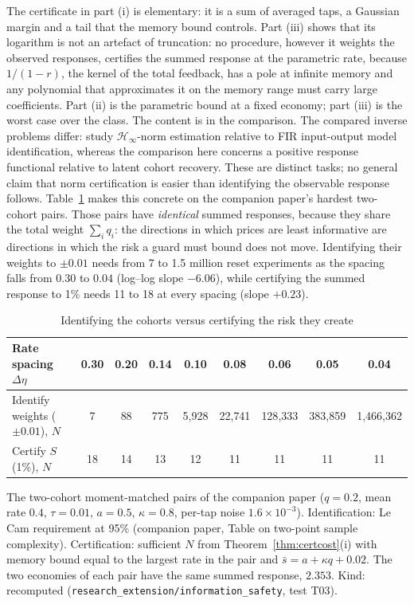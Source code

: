 The certificate in part (i) is elementary: it is a sum of averaged taps, a Gaussian margin and a tail that the memory bound controls. Part (iii) shows that its logarithm is not an artefact of truncation: no procedure, however it weights the observed responses, certifies the summed response at the parametric rate, because $1/(1-r)$, the kernel of the total feedback, has a pole at infinite memory and any polynomial that approximates it on the memory range must carry large coefficients. Part (ii) is the parametric bound at a fixed economy; part (iii) is the worst case over the class. The content is in the comparison. The compared inverse problems differ: \citet{tu2018} study $\mathcal H_\infty$-norm estimation relative to FIR input-output model identification, whereas the comparison here concerns a positive response functional relative to latent cohort recovery. These are distinct tasks; no general claim that norm certification is easier than identifying the observable response follows. Table~\ref{tab:certvsid} makes this concrete on the companion paper's hardest two-cohort pairs. Those pairs have \emph{identical} summed responses, because they share the total weight $\sum_iq_i$: the directions in which prices are least informative are directions in which the risk a guard must bound does not move. Identifying their weights to $\pm0.01$ needs from 7 to 1.5 million reset experiments as the spacing falls from $0.30$ to $0.04$ (log--log slope $-6.06$), while certifying the summed response to 1\% needs 11 to 18 at every spacing (slope $+0.23$).

\begin{table}[t]\centering\small
\begin{threeparttable}
\caption{Identifying the cohorts versus certifying the risk they create}\label{tab:certvsid}
\begin{tabular}{lcccccccc}
\toprule
Rate spacing $\Delta\eta$ & 0.30 & 0.20 & 0.14 & 0.10 & 0.08 & 0.06 & 0.05 & 0.04\\
\midrule
Identify weights ($\pm0.01$), $N$ & 7 & 88 & 775 & 5{,}928 & 22{,}741 & 128{,}333 & 383{,}859 & 1{,}466{,}362\\
Certify $S$ (1\%), $N$ & 18 & 14 & 13 & 12 & 11 & 11 & 11 & 11\\
\bottomrule
\end{tabular}
\begin{tablenotes}\footnotesize\item The two-cohort moment-matched pairs of the companion paper ($q=0.2$, mean rate $0.4$, $\tau=0.01$, $a=0.5$, $\kappa=0.8$, per-tap noise $1.6\times10^{-3}$). Identification: Le Cam requirement at 95\% (companion paper, Table on two-point sample complexity). Certification: sufficient $N$ from Theorem~\ref{thm:certcost}(i) with memory bound equal to the largest rate in the pair and $\bar s=a+\kappa q+0.02$. The two economies of each pair have the same summed response, $2.353$. Kind: recomputed (\texttt{research\_extension/information\_safety}, test T03).\end{tablenotes}
\end{threeparttable}
\end{table}

